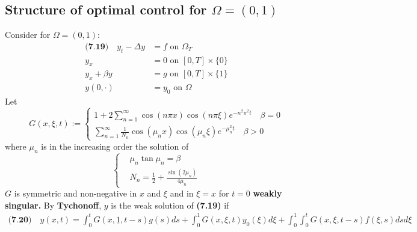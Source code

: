 \subsection{Structure of optimal control for $\Omega = (0, 1)$}
Consider for $\Omega = (0, 1)$:
\begin{align*}
	\textbf{(7.19)} \quad
	y_t - \Delta y &= f \text{ on } \Omega_T\\
	y_x &= 0 \text{ on } [0, T] \times \{0 \}\\
	y_x + \beta y &= g \text{ on } [0, T] \times \{1\}\\
	y(0, \cdot) &= y_0 \text{ on } \Omega
\end{align*}
Let
\begin{equation*}
	G(x, \xi, t):= 
	\left\{
	\begin{aligned}
		1 + 2 \sum_{n = 1}^\infty \cos(n\pi x)\cos(n \pi \xi)e^{-n^2 \pi^2 t}
		\quad \beta = 0\\
		\sum_{n = 1}^\infty \frac{1}{N_n}\cos(\mu_n x ) \cos(\mu_n \xi)e^{-\mu_n^2 t} \quad \beta > 0
	\end{aligned}
	\right.
\end{equation*}
where $\mu_n$ is in the increasing order the solution of 
\begin{equation*}
\left\{	
\begin{aligned}
	&\mu_n \tan \mu_n = \beta \\
	&N_n = \frac{1}{2} + \frac{\sin(2 \mu_n)}{4 \mu_n}
\end{aligned}
\right.
\end{equation*}
$G$ is symmetric and non-negative in $x$ and $\xi$ and in $\xi = x$ for $t = 0$ \textbf{weakly singular.} By \textbf{Tychonoff}, $y$ is the weak solution of \textbf{(7.19)} if 
\begin{align*}
\textbf{(7.20)} \quad
	y(x, t) = \int_0^t G(x, \underline{1}, t - s)g(s)ds + \int_0^1 G(x, \xi, t)y_0(\xi)d\xi + \int_0^1 \int_0^tG(x, \xi, t - s) f(\xi, s) ds d\xi
\end{align*}

